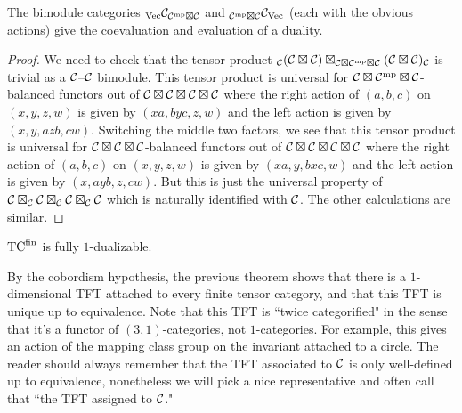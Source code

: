 \documentclass{amsart}
\begin{document}
\begin{theorem} \label{thm:objduals}
The bimodule categories ${}_\mathrm{\mathrm{Vec}} \mathcal C_{\mathcal C^{\mathrm{mp}} \boxtimes \mathcal C}$ and ${}_{\mathcal C^{\mathrm{mp}} \boxtimes \mathcal C} \mathcal C_{\mathrm{Vec}}$ (each with the obvious actions) give the coevaluation and evaluation of a duality.
\end{theorem}
\begin{proof}
We need to check that the tensor product ${}_\mathcal C (\mathcal C \boxtimes \mathcal C) \boxtimes_{\mathcal C \boxtimes \mathcal C^{\mathrm{mp}} \boxtimes \mathcal C} (\mathcal C \boxtimes \mathcal C)_\mathcal C$ is trivial as a $\mathcal C$--$\mathcal C$ bimodule.  This tensor product is universal for $\mathcal C \boxtimes \mathcal C^{\mathrm{mp}} \boxtimes \mathcal C$-balanced functors out of $\mathcal C \boxtimes \mathcal C \boxtimes \mathcal C \boxtimes \mathcal C$ where the right action of $(a,b,c)$ on $(x,y,z,w)$ is given by $(xa,byc,z,w)$ and the left action is given by $(x,y,azb,cw)$.  Switching the middle two factors, we see that this tensor product is universal for $\mathcal C \boxtimes \mathcal C \boxtimes \mathcal C$-balanced functors out of $\mathcal C \boxtimes \mathcal C \boxtimes \mathcal C \boxtimes \mathcal C$ where the right action of $(a,b,c)$ on $(x,y,z,w)$ is given by $(xa,y, bxc, w)$ and the left action is given by $(x, ayb, z,cw)$.  But this is just the universal property of $\mathcal C \boxtimes_\mathcal C \mathcal C \boxtimes_\mathcal C \mathcal C \boxtimes_\mathcal C \mathcal C$ which is naturally identified with $\mathcal C$.  The other calculations are similar.
\end{proof}  

\begin{proposition}
	${\mathrm{TC}^{\text{fin}}}$ is fully $1$-dualizable. 
\end{proposition}


By the cobordism hypothesis, the previous theorem shows that there is a $1$-dimensional TFT attached to every finite tensor category, and that this TFT is unique up to equivalence.  Note that this TFT is ``twice categorified" in the sense that it's a functor of $(3,1)$-categories, not $1$-categories.  For example, this gives an action of the mapping class group on the invariant attached to a circle.  The reader should always remember that the TFT associated to $\mathcal C$ is only well-defined up to equivalence, nonetheless we will pick a nice representative and often call that ``the TFT assigned to $\mathcal C$."
\end{document}
